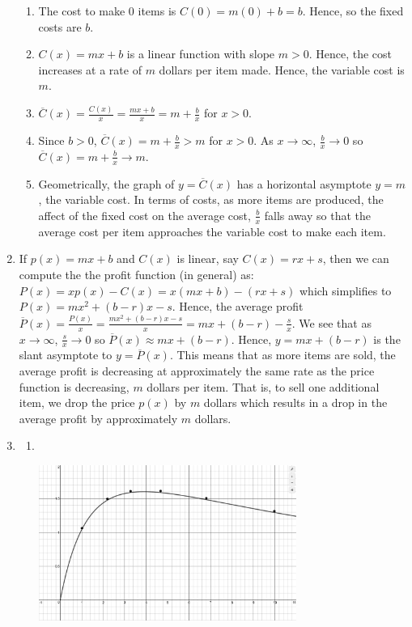 \documentclass{ximera}
\begin{document}
\begin{enumerate}
\begin{enumerate}
\item  The cost to make $0$ items is $C(0) = m(0)+b = b$.  Hence,  so the fixed costs are $b$.
\item $C(x) = mx+b$ is a linear function with slope $m>0$.  Hence, the cost increases at a rate of $m$ dollars per item made.  Hence, the variable cost is $m$.
\item  $\overline{C}(x) = \frac{C(x)}{x} = \frac{mx+b}{x} = m + \frac{b}{x}$ for $x > 0$.
\item  Since $b>0$,  $\overline{C}(x)  = m + \frac{b}{x} > m$ for $x > 0$. As $x \rightarrow \infty$, $\frac{b}{x} \rightarrow 0$ so $\overline{C}(x)  = m + \frac{b}{x} \rightarrow m$.
\item Geometrically, the graph of $y = \overline{C}(x)$ has a horizontal asymptote $y = m$, the variable cost.  In terms of costs, as more items are produced, the affect of the fixed cost on the average cost, $\frac{b}{x}$ falls away so that the average cost per item approaches the variable cost to make each item.

\end{enumerate}

\item   If $p(x) = mx + b$ and $C(x)$ is linear, say $C(x) = rx+s$, then we can compute the the profit function (in general) as: $P(x) = xp(x) - C(x) = x(mx+b) - (rx+s)$ which simplifies to $P(x) = mx^2 + (b-r)x -s$.  Hence, the average profit $\overline{P}(x) = \frac{P(x)}{x} = \frac{mx^2 + (b-r)x -s}{x} = mx + (b-r) - \frac{s}{x}$.  We see that as $x \rightarrow \infty$, $\frac{s}{x} \rightarrow 0$ so $\overline{P}(x) \approx mx  + (b-r)$.  Hence, $y = mx + (b-r)$ is the slant asymptote  to $y = \overline{P}(x)$.  This means that as more items are sold, the average profit is decreasing at approximately the same rate as the price function is decreasing, $m$ dollars per item.  That is, to sell one additional item, we drop the price $p(x)$ by $m$ dollars which results in a drop in the average profit by approximately $m$ dollars.

\pagebreak


\item \begin{enumerate}

\item $~$

\includegraphics[height=2in]{./IntroRationalGraphics/MaxPowerRegression.jpg}


\end{enumerate}
\end{enumerate}
\end{document}
